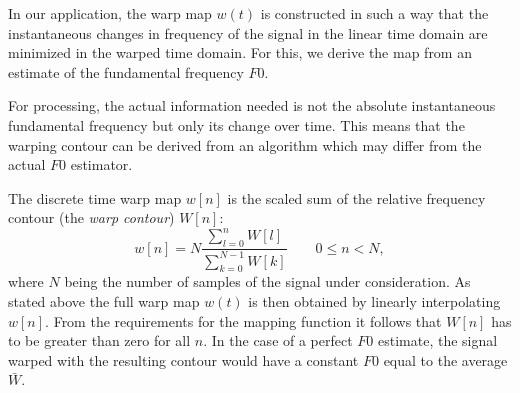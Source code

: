 In our application, the warp map $w(t)$ is constructed in such a way that the instantaneous changes in frequency of the signal in the linear time domain are minimized in the warped time domain. For this, we derive the map from an estimate of the fundamental frequency $F0$.

For processing, the actual information needed is not the absolute instantaneous fundamental frequency but only its change over time. This means that the warping contour can be derived from an algorithm which may differ from the actual $F0$ estimator.

The discrete time warp map $w[n]$ is the scaled sum of the relative
frequency contour (the \emph{warp contour}) $W[n]$:
\begin{equation}
w[n]=N \frac{\sum^n_{l=0}{W[l]}}{\sum^{N-1}_{k=0}{W[k]}}  \qquad 0\leq n<N,
\end{equation}
where $N$ being the number of samples of the signal under consideration.
As stated above the full warp map $w(t)$ is then obtained by linearly interpolating $w[n]$. From the requirements for the mapping function it follows that $W[n]$ has to be greater than zero for all $n$. In the case of a perfect $F0$ estimate, the signal warped with the resulting contour would have a constant $F0$ equal to the average $\bar{W}$.

